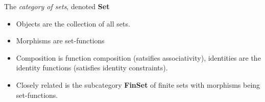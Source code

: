 The \emph{category of sets}, denoted \textbf{Set}

\begin{itemize}
    \item Objects are the collection of all sets.
    \item Morphisms are set-functions
    \item Composition is function composition (satsifies associativity), identities are the identity functions (satisfies identity constraints).
    \item Closely related is the subcategory \textbf{FinSet} of finite sets with morphisms being set-functions.

  \end{itemize}
